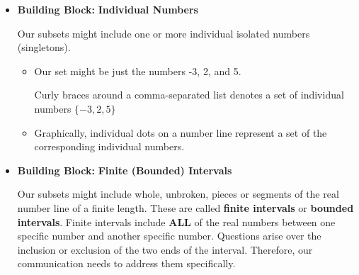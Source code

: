 \documentclass{ximera}
\begin{document}
\begin{itemize}
\item \textbf{Building Block:} \textbf{\textcolor{purple!85!blue}{Individual Numbers}}  

Our subsets might include one or more individual isolated numbers (singletons).  
	\begin{itemize}
	\item Our set might be just the numbers -3, 2, and 5.

	Curly braces around a comma-separated list denotes a set of individual numbers $\{ -3, 2, 5 \}$

	\item Graphically, individual dots on a number line represent a set of the corresponding individual numbers.

	\begin{image}
	\end{image}



	\end{itemize}



\item  \textbf{Building Block:} \textbf{\textcolor{purple!85!blue}{Finite (Bounded) Intervals}}   

Our subsets might include whole, unbroken, pieces or segments of the real number line of a finite length.  These are called \textbf{finite intervals} or \textbf{bounded intervals}.   Finite intervals include \textbf{\textcolor{red!70!darkgray}{ALL}} of the real numbers between one specific number and another specific number.  Questions arise over the inclusion or exclusion of the two ends of the interval. Therefore, our communication needs to address them specifically.


\end{itemize}
\end{document}
